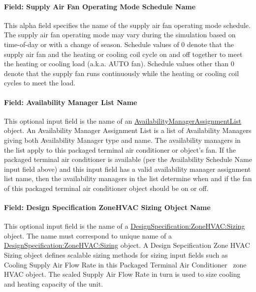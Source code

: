\paragraph{Field: Supply Air Fan Operating Mode Schedule Name}\label{field-supply-air-fan-operating-mode-schedule-name-4}

This alpha field specifies the name of the supply air fan operating mode schedule. The supply air fan operating mode may vary during the simulation based on time-of-day or with a change of season. Schedule values of 0 denote that the supply air fan and the heating or cooling coil cycle on and off together to meet the heating or cooling load (a.k.a. AUTO fan). Schedule values other than 0 denote that the supply fan runs continuously while the heating or cooling coil cycles to meet the load.

\paragraph{Field: Availability Manager List Name}\label{field-availability-manager-list-name-6}

This optional input field is the name of an \hyperref[availabilitymanagerassignmentlist]{AvailabilityManagerAssignmentList} object. An Availability Manager Assignment List is a list of Availability Managers giving both Availability Manager type and name. The availability managers in the list apply to this packaged terminal air conditioner or object's fan. If the packaged terminal air conditioner is available (per the Availability Schedule Name input field above) and this input field has a valid availability manager assignment list name, then the availability managers in the list determine when and if the fan of this packaged terminal air conditioner object should be on or off.

\paragraph{Field: Design Specification ZoneHVAC Sizing Object Name}\label{field-design-specification-zonehvac-sizing-object-name-6}

This optional input field is the name of a \hyperref[designspecificationzonehvacsizing]{DesignSpecification:ZoneHVAC:Sizing} object. The name must correspond to unique name of a \hyperref[designspecificationzonehvacsizing]{DesignSpecification:ZoneHVAC:Sizing} object. A Design Sepcification Zone HVAC Sizing object defines scalable sizing methods for sizing input fields such as Cooling Supply Air Flow Rate in this Packaged Terminal Air Conditioner~ zone HVAC object. The scaled Supply Air Flow Rate in turn is used to size cooling and heating capacity of the unit.


